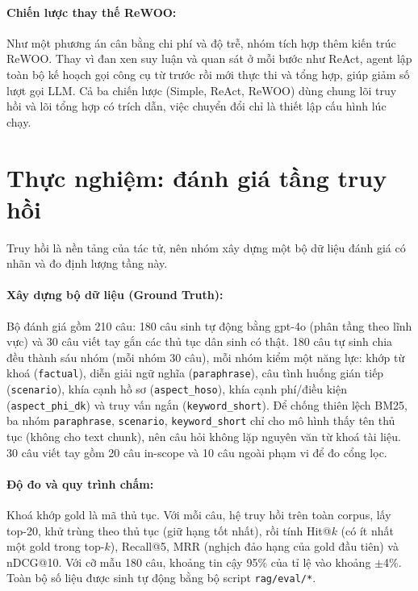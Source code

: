 \documentclass[11pt]{article}
\begin{document}

\paragraph{Chiến lược thay thế ReWOO: }
Như một phương án cân bằng chi phí và độ trễ, nhóm tích hợp thêm kiến trúc ReWOO. Thay vì đan
xen suy luận và quan sát ở mỗi bước như ReAct, agent lập toàn bộ kế hoạch gọi công cụ từ
trước rồi mới thực thi và tổng hợp, giúp giảm số lượt gọi LLM. Cả ba chiến lược (Simple, ReAct,
ReWOO) dùng chung lõi truy hồi và lõi tổng hợp có trích dẫn, việc chuyển đổi chỉ là thiết lập
cấu hình lúc chạy.

\section{Thực nghiệm: đánh giá tầng truy hồi}
Truy hồi là nền tảng của tác tử, nên nhóm xây dựng một bộ dữ liệu đánh giá có nhãn và đo định
lượng tầng này.

\paragraph{Xây dựng bộ dữ liệu (Ground Truth): }
Bộ đánh giá gồm 210 câu: 180 câu sinh tự động bằng gpt-4o (phân tầng theo lĩnh vực) và 30 câu
viết tay gắn các thủ tục dân sinh có thật. 180 câu tự sinh chia đều thành sáu nhóm (mỗi nhóm
30 câu), mỗi nhóm kiểm một năng lực: khớp từ khoá (\texttt{factual}), diễn giải ngữ nghĩa
(\texttt{paraphrase}), câu tình huống gián tiếp (\texttt{scenario}), khía cạnh hồ sơ
(\texttt{aspect\_hoso}), khía cạnh phí/điều kiện (\texttt{aspect\_phi\_dk}) và truy vấn ngắn
(\texttt{keyword\_short}). Để chống thiên lệch BM25, ba nhóm \texttt{paraphrase}, \texttt{scenario},
\texttt{keyword\_short} chỉ cho mô hình thấy tên thủ tục (không cho text chunk), nên câu hỏi
không lặp nguyên văn từ khoá tài liệu. 30 câu viết tay gồm 20 câu in-scope và 10 câu ngoài
phạm vi để đo cổng lọc.

\paragraph{Độ đo và quy trình chấm: }
Khoá khớp gold là mã thủ tục. Với mỗi câu, hệ truy hồi trên toàn corpus, lấy top-20, khử trùng
theo thủ tục (giữ hạng tốt nhất), rồi tính Hit@$k$ (có ít nhất một gold trong top-$k$),
Recall@5, MRR (nghịch đảo hạng của gold đầu tiên) và nDCG@10. Với cỡ mẫu 180 câu, khoảng tin
cậy 95\% của tỉ lệ vào khoảng $\pm$4\%. Toàn bộ số liệu được sinh tự động bằng bộ script
\texttt{rag/eval/*}.
\end{document}
